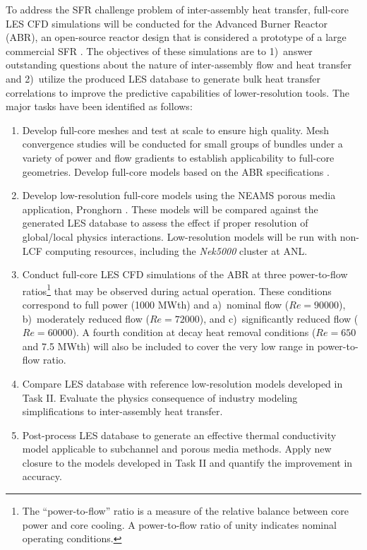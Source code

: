 To address the SFR challenge problem of inter-assembly heat transfer, full-core
LES CFD simulations will be conducted for the Advanced Burner Reactor (ABR), an
open-source reactor design that is considered a prototype of a large commercial
SFR \cite{abr}. The objectives of these simulations are to 1)~answer
outstanding questions about the nature of inter-assembly flow and heat transfer
and 2)~utilize the produced LES database to generate bulk heat
transfer correlations to improve the predictive capabilities of
lower-resolution tools. The major tasks have been identified as follows:

\vspace{-.15in}
\begin{enumerate}[label=\textbf{\Roman*}]
\item Develop full-core meshes and test at scale to ensure high quality. Mesh convergence studies will be conducted for small groups of bundles under a variety of power and flow gradients to establish applicability to full-core geometries. Develop full-core models based on the ABR specifications \cite{abr}.
\item Develop low-resolution full-core models using the NEAMS porous media application, Pronghorn \cite{novak2021b}. These models will be compared against the generated LES database to assess the effect if proper resolution of global/local physics interactions. Low-resolution models will be run with non-LCF computing resources, including the {\em Nek5000}
cluster at ANL.
\item Conduct full-core LES CFD simulations of the ABR at three power-to-flow ratios\footnote{The ``power-to-flow'' ratio is a measure of the relative balance between core power and core cooling. A power-to-flow ratio of unity indicates nominal operating conditions.} that may be observed during actual operation. These conditions correspond to full power (1000 MWth) and a)~nominal flow (\(Re=90000\)), b)~moderately reduced flow (\(Re=72000\)), and c)~significantly reduced flow (\(Re=60000\)). A fourth condition at decay heat removal conditions (\(Re=650\) and 7.5 MWth) will also be included to cover the very low range in power-to-flow ratio.
\item Compare LES database with reference low-resolution models developed in Task II. Evaluate the physics consequence of industry modeling simplifications to inter-assembly heat transfer.
\item Post-process LES database to generate an effective thermal conductivity model applicable to subchannel and porous media methods. Apply new closure to the models developed in Task II and quantify the improvement in accuracy.
\end{enumerate}
\vspace{-.15in}


